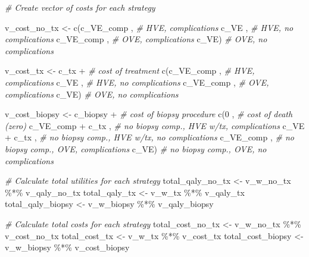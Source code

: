 \documentclass[
]{article}
\newenvironment{Shaded}{\begin{snugshade}}{\end{snugshade}}
\newcommand{\CommentTok}[1]{\textcolor[rgb]{0.56,0.35,0.01}{\textit{#1}}}
\newcommand{\DecValTok}[1]{\textcolor[rgb]{0.00,0.00,0.81}{#1}}
\newcommand{\FunctionTok}[1]{\textcolor[rgb]{0.00,0.00,0.00}{#1}}
\newcommand{\NormalTok}[1]{#1}
\newcommand{\OtherTok}[1]{\textcolor[rgb]{0.56,0.35,0.01}{#1}}
\newcommand{\SpecialCharTok}[1]{\textcolor[rgb]{0.00,0.00,0.00}{#1}}
\begin{document}
\begin{Shaded}
\begin{Highlighting}[]
\CommentTok{\# Create vector of costs for each strategy }
  
\NormalTok{v\_cost\_no\_tx  }\OtherTok{\textless{}{-}} \FunctionTok{c}\NormalTok{(c\_VE\_comp ,          }\CommentTok{\# HVE, complications}
\NormalTok{                   c\_VE      ,          }\CommentTok{\# HVE, no complications}
\NormalTok{                   c\_VE\_comp ,          }\CommentTok{\# OVE, complications}
\NormalTok{                   c\_VE)                }\CommentTok{\# OVE, no complications}
  
\NormalTok{v\_cost\_tx     }\OtherTok{\textless{}{-}}\NormalTok{ c\_tx }\SpecialCharTok{+}                 \CommentTok{\# cost of treatment}
                 \FunctionTok{c}\NormalTok{(c\_VE\_comp ,          }\CommentTok{\# HVE, complications}
\NormalTok{                   c\_VE      ,          }\CommentTok{\# HVE, no complications}
\NormalTok{                   c\_VE\_comp ,          }\CommentTok{\# OVE, complications}
\NormalTok{                   c\_VE)                }\CommentTok{\# OVE, no complications}
  
\NormalTok{v\_cost\_biopsy }\OtherTok{\textless{}{-}}\NormalTok{ c\_biopsy           }\SpecialCharTok{+}   \CommentTok{\# cost of biopsy procedure}
                 \FunctionTok{c}\NormalTok{(}\DecValTok{0}\NormalTok{                ,   }\CommentTok{\# cost of death (zero)}
\NormalTok{                   c\_VE\_comp }\SpecialCharTok{+}\NormalTok{ c\_tx ,   }\CommentTok{\# no biopsy comp., HVE w/tx, complications }
\NormalTok{                   c\_VE }\SpecialCharTok{+}\NormalTok{ c\_tx      ,   }\CommentTok{\# no biopsy comp., HVE w/tx, no complications}
\NormalTok{                   c\_VE\_comp        ,   }\CommentTok{\# no biopsy comp., OVE, complications}
\NormalTok{                   c\_VE)                }\CommentTok{\# no biopsy comp., OVE, no complications}
 
\CommentTok{\# Calculate total utilities for each strategy }
\NormalTok{total\_qaly\_no\_tx  }\OtherTok{\textless{}{-}}\NormalTok{ v\_w\_no\_tx  }\SpecialCharTok{\%*\%}\NormalTok{  v\_qaly\_no\_tx      }
\NormalTok{total\_qaly\_tx     }\OtherTok{\textless{}{-}}\NormalTok{ v\_w\_tx     }\SpecialCharTok{\%*\%}\NormalTok{  v\_qaly\_tx}
\NormalTok{total\_qaly\_biopsy }\OtherTok{\textless{}{-}}\NormalTok{ v\_w\_biopsy }\SpecialCharTok{\%*\%}\NormalTok{  v\_qaly\_biopsy}
  
\CommentTok{\# Calculate total costs for each strategy }
\NormalTok{total\_cost\_no\_tx  }\OtherTok{\textless{}{-}}\NormalTok{ v\_w\_no\_tx  }\SpecialCharTok{\%*\%}\NormalTok{  v\_cost\_no\_tx    }
\NormalTok{total\_cost\_tx     }\OtherTok{\textless{}{-}}\NormalTok{ v\_w\_tx     }\SpecialCharTok{\%*\%}\NormalTok{  v\_cost\_tx}
\NormalTok{total\_cost\_biopsy }\OtherTok{\textless{}{-}}\NormalTok{ v\_w\_biopsy }\SpecialCharTok{\%*\%}\NormalTok{  v\_cost\_biopsy}
  

\end{Highlighting}
\end{Shaded}
\end{document}
